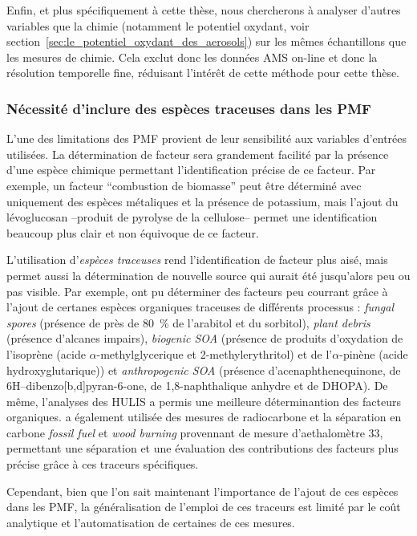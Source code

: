 Enfin, et plus spécifiquement à cette thèse, nous chercherons à analyser d'autres
variables que la chimie (notamment le potentiel oxydant, voir
section~\ref{sec:le_potentiel_oxydant_des_aerosols}) sur les mêmes échantillons que les
mesures de chimie. Cela exclut donc les données AMS on-line et donc la résolution
temporelle fine, réduisant l'intérêt de cette méthode pour cette thèse.

\subsubsection{Nécessité d'inclure des espèces traceuses dans les PMF}%
\label{ssub:nécessité_d_inclure_des_espèces_traceuses}

L'une des limitations des PMF provient de leur sensibilité aux variables d'entrées
utilisées. La détermination de facteur sera grandement facilité par la présence d'une
espèce chimique permettant l'identification précise de ce facteur.
Par exemple, un facteur ``combustion de biomasse'' peut être déterminé avec uniquement des
espèces métaliques et la présence de potassium, mais l'ajout du lévoglucosan --produit de
pyrolyse de la cellulose-- permet une identification beaucoup plus clair et non équivoque
de ce facteur.

L'utilisation d'\textit{espèces traceuses} rend l'identification de facteur plus aisé,
mais permet aussi la détermination de nouvelle source qui aurait été jusqu'alors peu ou
pas visible.
Par exemple, \cite{srivastavaSpeciation2018a} ont pu déterminer des facteurs peu courrant
grâce à l'ajout de certanes espèces organiques traceuses de différents processus :
\textit{fungal spores} (présence de près de \SI{80}{\percent} de l'arabitol et du sorbitol),
\textit{plant debris} (présence d'alcanes impairs), \textit{biogenic SOA}
(présence de produits d'oxydation de l'isoprène (acide $\alpha$-methylglycerique et 2-methylerythritol) et de
l'$\alpha$-pinène (acide hydroxyglutarique)) et \textit{anthropogenic SOA} (présence
d'acenaphthenequinone, de 6H–dibenzo[b,d]pyran-6-one, de 1,8-naphthalique anhydre et de
DHOPA).
De même, l'analyses des HULIS a permis une meilleure déterminantion des facteurs organiques.
\cite{chevrierChauffage2016} a également utilisée des mesures de radiocarbone et la
séparation en carbone \textit{fossil fuel} et \textit{wood burning} provennant de mesure
d'aethalomètre 33, permettant une séparation et une évaluation des
contributions des facteurs plus précise grâce à ces traceurs spécifiques.

Cependant, bien que l'on sait maintenant l'importance de l'ajout de ces espèces dans les
PMF, la généralisation de l'emploi de ces traceurs est limité par le coût analytique
et l'automatisation de certaines de ces mesures.

